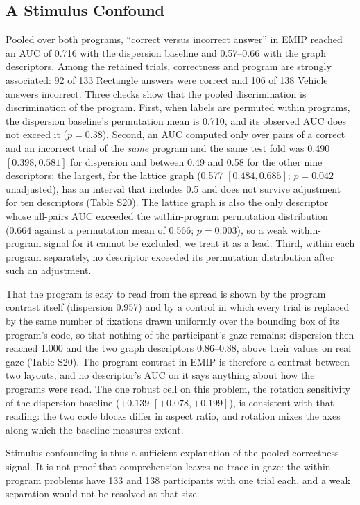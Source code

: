 \subsection{A Stimulus Confound}\label{sec:confound}
Pooled over both programs, ``correct versus incorrect answer'' in EMIP reached an AUC of 0.716 with the dispersion baseline and 0.57--0.66 with the graph descriptors. Among the retained trials, correctness and program are strongly associated: 92 of 133 Rectangle answers were correct and 106 of 138 Vehicle answers incorrect. Three checks show that the pooled discrimination is discrimination of the program. First, when labels are permuted within programs, the dispersion baseline's permutation mean is 0.710, and its observed AUC does not exceed it ($p = 0.38$). Second, an AUC computed only over pairs of a correct and an incorrect trial of the \emph{same} program and the same test fold was 0.490 $[0.398, 0.581]$ for dispersion and between 0.49 and 0.58 for the other nine descriptors; the largest, for the lattice graph (0.577 $[0.484, 0.685]$; $p = 0.042$ unadjusted), has an interval that includes 0.5 and does not survive adjustment for ten descriptors (Table S20). The lattice graph is also the only descriptor whose all-pairs AUC exceeded the within-program permutation distribution (0.664 against a permutation mean of 0.566; $p = 0.003$), so a weak within-program signal for it cannot be excluded; we treat it as a lead. Third, within each program separately, no descriptor exceeded its permutation distribution after such an adjustment.

That the program is easy to read from the spread is shown by the program contrast itself (dispersion 0.957) and by a control in which every trial is replaced by the same number of fixations drawn uniformly over the bounding box of its program's code, so that nothing of the participant's gaze remains: dispersion then reached 1.000 and the two graph descriptors 0.86--0.88, above their values on real gaze (Table S20). The program contrast in EMIP is therefore a contrast between two layouts, and no descriptor's AUC on it says anything about how the programs were read. The one robust cell on this problem, the rotation sensitivity of the dispersion baseline ($+0.139$ $[+0.078, +0.199]$), is consistent with that reading: the two code blocks differ in aspect ratio, and rotation mixes the axes along which the baseline measures extent.

Stimulus confounding is thus a sufficient explanation of the pooled correctness signal. It is not proof that comprehension leaves no trace in gaze: the within-program problems have 133 and 138 participants with one trial each, and a weak separation would not be resolved at that size.

